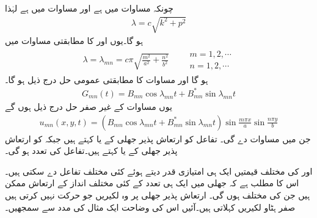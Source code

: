 چونکہ مساوات  میں  ہے اور مساوات  میں  ہے  لہٰذا
\begin{align*}
\lambda=c\sqrt{k^2+p^2}
\end{align*}
ہو گا۔یوں  اور  کا مطابقتی  مساوات  میں
\begin{align}\label{مساوات_جزوی_مستطیل_مستقل_ب}
\lambda=\lambda_{mn}=c\pi\sqrt{\frac{m^2}{a^2}+\frac{n^2}{b^2}}\quad \quad \substack{m=1,2,\cdots\\n=1,2,\cdots}
\end{align}
ہو گا اور مساوات  کا مطابقتی  عمومی حل درج ذیل ہو گا۔
\begin{align*}
G_{mn}(t)=B_{mn}\cos \lambda_{mn}t+B^*_{mn}\sin \lambda_{mn}t
\end{align*}
یوں مساوات  کے غیر صفر  حل  درج ذیل ہوں گے
\begin{align}\label{مساوات_جزوی_مستطیل_مستقل_پ}
u_{mn}(x,y,t)=(B_{mn}\cos \lambda_{mn}t+B^*_{mn}\sin \lambda_{mn}t)\sin \frac{m\pi x}{a}\sin \frac{n\pi y}{b}
\end{align}
 جن میں  مساوات  دے گی۔ تفاعل  کو ارتعاش پذیر جھلی کے  یا  کہتے ہیں جبکہ  کو ارتعاش پذیر جھلی کے  یا  کہتے ہیں۔تفاعل  کی تعدد  ہو گی۔

 اور  کی مختلف قیمتیں ایک ہی  امتیازی قدر دیتے ہوئے کئی مختلف  تفاعل  دے سکتی ہیں۔اس کا مطلب ہے کہ جھلی میں ایک ہی تعدد کے  کئی مختلف انداز کے ارتعاش ممکن ہیں جن کی   مختلف ہوں گی۔ ارتعاش پذیر جھلی پر وہ لکیریں جو حرکت نہیں کرتی ہیں صفر ہٹاو لکیریں کہلاتی ہیں۔آئیں اس کی وضاحت ایک مثال کی مدد سے سمجھیں۔

